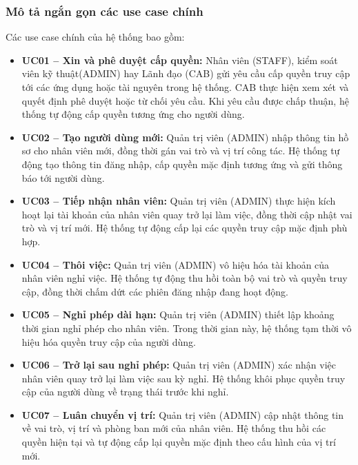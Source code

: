 \documentclass[../DoAn.tex]{subfiles}
\begin{document}
\subsubsection{Mô tả ngắn gọn các use case chính}
Các use case chính của hệ thống bao gồm:
\begin{itemize}
    \item \textbf{UC01 -- Xin và phê duyệt cấp quyền:} Nhân viên (STAFF), kiểm soát viên kỹ thuật(ADMIN) hay Lãnh đạo (CAB) gửi yêu cầu cấp quyền truy cập tới các ứng dụng hoặc tài nguyên trong hệ thống. CAB thực hiện xem xét và quyết định phê duyệt hoặc từ chối yêu cầu. Khi yêu cầu được chấp thuận, hệ thống tự động cấp quyền tương ứng cho người dùng.

    \item \textbf{UC02 -- Tạo người dùng mới:} Quản trị viên (ADMIN) nhập thông tin hồ sơ cho nhân viên mới, đồng thời gán vai trò và vị trí công tác. Hệ thống tự động tạo thông tin đăng nhập, cấp quyền mặc định tương ứng và gửi thông báo tới người dùng.

    \item \textbf{UC03 -- Tiếp nhận nhân viên:} Quản trị viên (ADMIN) thực hiện kích hoạt lại tài khoản của nhân viên quay trở lại làm việc, đồng thời cập nhật vai trò và vị trí mới. Hệ thống tự động cấp lại các quyền truy cập mặc định phù hợp.

    \item \textbf{UC04 -- Thôi việc:} Quản trị viên (ADMIN) vô hiệu hóa tài khoản của nhân viên nghỉ việc. Hệ thống tự động thu hồi toàn bộ vai trò và quyền truy cập, đồng thời chấm dứt các phiên đăng nhập đang hoạt động.

    \item \textbf{UC05 -- Nghỉ phép dài hạn:} Quản trị viên (ADMIN) thiết lập khoảng thời gian nghỉ phép cho nhân viên. Trong thời gian này, hệ thống tạm thời vô hiệu hóa quyền truy cập của người dùng.

    \item \textbf{UC06 -- Trở lại sau nghỉ phép:} Quản trị viên (ADMIN) xác nhận việc nhân viên quay trở lại làm việc sau kỳ nghỉ. Hệ thống khôi phục quyền truy cập của người dùng về trạng thái trước khi nghỉ.

    \item \textbf{UC07 -- Luân chuyển vị trí:} Quản trị viên (ADMIN) cập nhật thông tin về vai trò, vị trí và phòng ban mới của nhân viên. Hệ thống thu hồi các quyền hiện tại và tự động cấp lại quyền mặc định theo cấu hình của vị trí mới.


\end{itemize}
\end{document}
